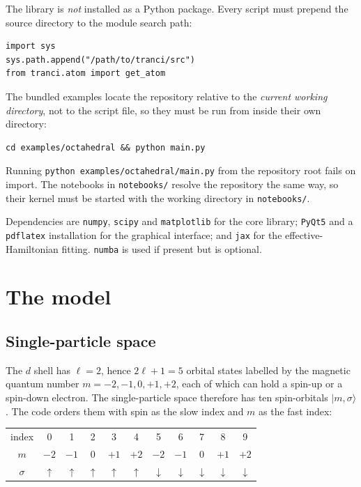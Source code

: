 \documentclass[11pt,a4paper]{article}
\newcommand{\op}[1]{\texttt{#1}}
\begin{document}
The library is \emph{not} installed as a Python package.  Every script must
prepend the source directory to the module search path:

\begin{lstlisting}
import sys
sys.path.append("/path/to/tranci/src")
from tranci.atom import get_atom
\end{lstlisting}

The bundled examples locate the repository relative to the \emph{current working
directory}, not to the script file, so they must be run from inside their own
directory:

\begin{lstlisting}
cd examples/octahedral && python main.py
\end{lstlisting}

Running \op{python examples/octahedral/main.py} from the repository root fails on
import.  The notebooks in \op{notebooks/} resolve the repository the same way,
so their kernel must be started with the working directory in \op{notebooks/}.

Dependencies are \op{numpy}, \op{scipy} and \op{matplotlib} for the core
library; \op{PyQt5} and a \op{pdflatex} installation for the graphical
interface; and \op{jax} for the effective-Hamiltonian fitting.  \op{numba} is
used if present but is optional.

\section{The model}

\subsection{Single-particle space}
\label{sec:spbasis}

The $d$ shell has $\ell=2$, hence $2\ell+1=5$ orbital states labelled by the
magnetic quantum number $m=-2,-1,0,+1,+2$, each of which can hold a spin-up or a
spin-down electron.  The single-particle space therefore has ten spin-orbitals
$|m,\sigma\rangle$.  The code orders them with spin as the slow index and $m$ as
the fast index:

\begin{center}
\begin{tabular}{ccccccccccc}
\toprule
index      & 0 & 1 & 2 & 3 & 4 & 5 & 6 & 7 & 8 & 9\\
$m$        & $-2$ & $-1$ & $0$ & $+1$ & $+2$ & $-2$ & $-1$ & $0$ & $+1$ & $+2$\\
$\sigma$   & $\uparrow$ & $\uparrow$ & $\uparrow$ & $\uparrow$ & $\uparrow$
           & $\downarrow$ & $\downarrow$ & $\downarrow$ & $\downarrow$ & $\downarrow$\\
\bottomrule
\end{tabular}
\end{center}
\end{document}
